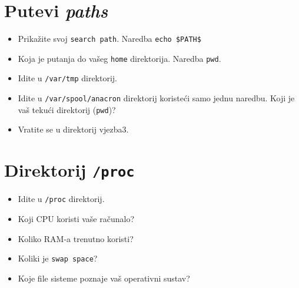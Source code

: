\section{Putevi \textit{paths}}
\begin{itemize}
 \item Prikažite svoj \texttt{search path}. Naredba \texttt{echo \$PATH\$}
\item Koja je putanja do vašeg \texttt{home} direktorija. Naredba \texttt{pwd}. 
\item Idite u \texttt{/var/tmp} direktorij.
\item Idite u \texttt{/var/spool/anacron} direktorij koristeći samo jednu naredbu. Koji je vaš tekući direktorij (\texttt{pwd})?
\item Vratite se u direktorij vjezba3.
\end{itemize}

\section{Direktorij \texttt{/proc} }
\begin{itemize}
 \item Idite u \texttt{/proc} direktorij.
\item Koji CPU koristi vaše računalo?
\item Koliko RAM-a trenutno koristi?
\item Koliki je \texttt{swap space}?
\item Koje file sisteme poznaje vaš operativni sustav?
\end{itemize}

\vfill
